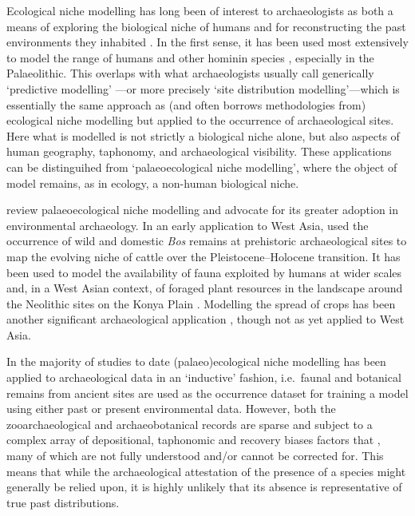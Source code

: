 \documentclass[
  authoryear,
  preprint]{elsarticle}
\begin{document}
Ecological niche modelling has long been of interest to archaeologists
as both a means of exploring the biological niche of humans and for
reconstructing the past environments they inhabited
\citep{DavidPollyEronen2011, FranklinEtAl2015}. In the first sense, it
has been used most extensively to model the range of humans and other
hominin species
\citep[e.g.][]{BenitoEtAl2017, YousefiEtAl2020, BanksEtAl2021, YaworskyEtAl2024a, YaworskyEtAl2024b, GuranEtAl2024},
especially in the Palaeolithic. This overlaps with what archaeologists
usually call generically `predictive modelling'
\citep{VerhagenWhitley2020}---or more precisely `site distribution
modelling'---which is essentially the same approach as (and often
borrows methodologies from) ecological niche modelling but applied to
the occurrence of archaeological sites. Here what is modelled is not
strictly a biological niche alone, but also aspects of human geography,
taphonomy, and archaeological visibility. These applications can be
distinguihed from `palaeoecological niche modelling', where the object
of model remains, as in ecology, a non-human biological niche.

\citet{FranklinEtAl2015} review palaeoecological niche modelling and
advocate for its greater adoption in environmental archaeology. In an
early application to West Asia, \citet{ConollyEtAl2012} used the
occurrence of wild and domestic \emph{Bos} remains at prehistoric
archaeological sites to map the evolving niche of cattle over the
Pleistocene--Holocene transition. It has been used to model the
availability of fauna exploited by humans at wider scales
\citep[e.g.][]{deAndresHerreroEtAl2018, YaworskyEtAl2023} and, in a West
Asian context, of foraged plant resources in the landscape around the
Neolithic sites on the Konya Plain \citep{CollinsEtAl2018}. Modelling
the spread of crops has been another significant archaeological
application \citep[e.g.][]{KrzyzanskaEtAl2022, Krzyzanska2023}, though
not as yet applied to West Asia.

In the majority of studies to date (palaeo)ecological niche modelling
has been applied to archaeological data in an `inductive' fashion,
i.e.~faunal and botanical remains from ancient sites are used as the
occurrence dataset for training a model using either past or present
environmental data. However, both the zooarchaeological and
archaeobotanical records are sparse and subject to a complex array of
depositional, taphonomic and recovery biases factors that , many of
which are not fully understood and/or cannot be corrected for. This
means that while the archaeological attestation of the presence of a
species might generally be relied upon, it is highly unlikely that its
absence is representative of true past distributions.
\end{document}
